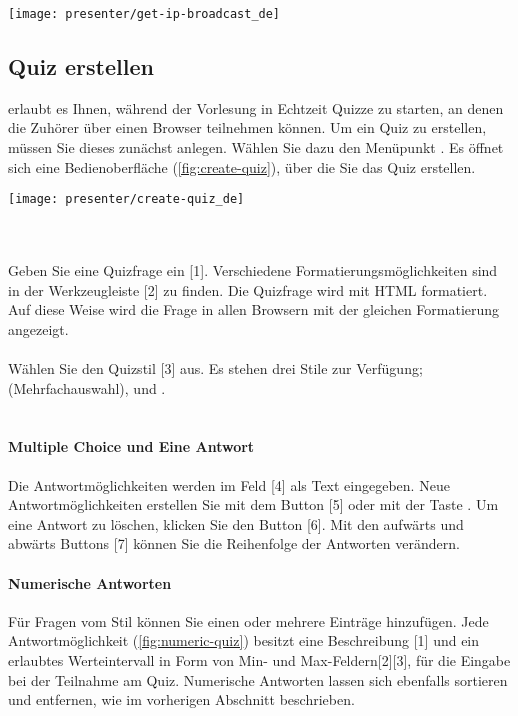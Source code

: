 \par
\begin{minipage}{0.9\textwidth}
	\centering
	\captionsetup{type=figure}
	\texttt{[image: presenter/get-ip-broadcast\_de]}
  	\label{fig:get-ip-broadcast}
\end{minipage}


\subsection{Quiz erstellen}
\label{section:create-quiz}
\lectPresenter{} erlaubt es Ihnen, während der Vorlesung in Echtzeit Quizze zu starten, an denen die Zuhörer über einen Browser teilnehmen können. Um ein Quiz zu erstellen, müssen Sie dieses zunächst anlegen. Wählen Sie dazu den Menüpunkt . Es öffnet sich eine Bedienoberfläche (\autoref{fig:create-quiz}), über die Sie das Quiz erstellen.

\begin{minipage}{0.9\textwidth}
	\centering
	\captionsetup{type=figure}
	\texttt{[image: presenter/create-quiz\_de]}
  	\label{fig:create-quiz}
\end{minipage}
\\\\
Geben Sie eine Quizfrage ein [1]. Verschiedene Formatierungsmöglichkeiten sind in der Werkzeugleiste [2] zu finden. Die Quizfrage wird mit HTML formatiert. Auf diese Weise wird die Frage in allen Browsern mit der gleichen Formatierung angezeigt.
\\\\
Wählen Sie den Quizstil [3] aus. Es stehen drei Stile zur Verfügung;  (Mehrfachauswahl),  und .
\\\\
\paragraph{Multiple Choice und Eine Antwort}
Die Antwortmöglichkeiten werden im Feld [4] als Text eingegeben. Neue Antwortmöglichkeiten erstellen Sie mit dem Button [5] oder mit der Taste . Um eine Antwort zu löschen, klicken Sie den \menu[,]{$\times$} Button [6]. Mit den aufwärts und abwärts Buttons [7] können Sie die Reihenfolge der Antworten verändern.

\paragraph{Numerische Antworten}
Für Fragen vom Stil  können Sie einen oder mehrere Einträge hinzufügen. Jede Antwortmöglichkeit (\autoref{fig:numeric-quiz}) besitzt eine Beschreibung [1] und ein erlaubtes Werteintervall in Form von Min- und Max-Feldern[2][3], für die Eingabe bei der Teilnahme am Quiz. Numerische Antworten lassen sich ebenfalls sortieren und entfernen, wie im vorherigen Abschnitt beschrieben.

